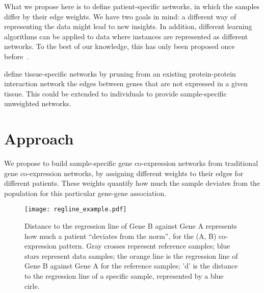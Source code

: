 \documentclass{bioinfo}
\begin{document}
What we propose here is to define patient-specific networks, in which the samples differ by their edge weights. We have two goals in mind: a different way of representing the data might lead to new insights. In addition, different learning algorithms can be applied to data where instances are represented as different networks. To the best of our knowledge, this has only been proposed once before~\citep{kuijjer2015}.

\cite{bossi2009} define tissue-specific networks by pruning from an existing protein-protein interaction network the edges between genes that are not expressed in a given tissue. This could be extended to individuals to provide sample-specific unweighted networks. 






\section{Approach}

We propose to build sample-specific gene co-expression networks from traditional gene co-expression networks, by assigning different weights to their edges for different patients. These weights quantify how much the sample deviates from the population for this particular gene-gene association. 

\begin{figure}[!tpb]
  \centerline{\texttt{[image: regline\_example.pdf]}}
  \caption{Distance to the regression line of Gene B against Gene A represents how much a patient ``deviates from the norm'', for the (A, B) co-expression pattern. Gray crosses represent reference samples; blue stars represent data samples; the orange line is the regression line of Gene B against Gene A for the reference samples; 'd' is the distance to the regression line of a specific sample, represented by a blue cirle.}
  \label{fig:distance_to_regline}
\end{figure}
\end{document}
